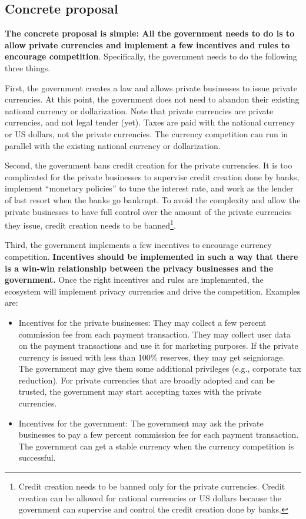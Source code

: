 \documentclass[dvipdfmx,a4paper]{article}
\begin{document}
\subsection{Concrete proposal}

\textbf{The concrete proposal is simple: All the government needs to do is to allow private currencies and implement a few incentives and rules to encourage competition}. Specifically, the government needs to do the following three things.

First, the government creates a law and allows private businesses to issue private currencies. At this point, the government does not need to abandon their existing national currency or dollarization. Note that private currencies are private currencies, and not legal tender (yet). Taxes are paid with the national currency or US dollars, not the private currencies. The currency competition can run in parallel with the existing national currency or dollarization.

Second, the government bans credit creation for the private currencies. It is too complicated for the private businesses to supervise credit creation done by banks, implement ``monetary policies'' to tune the interest rate, and work as the lender of last resort when the banks go bankrupt. To avoid the complexity and allow the private businesses to have full control over the amount of the private currencies they issue, credit creation needs to be banned\footnote{Credit creation needs to be banned only for the private currencies. Credit creation can be allowed for national currencies or US dollars because the government can supervise and control the credit creation done by banks.}.

Third, the government implements a few incentives to encourage currency competition. \textbf{Incentives should be implemented in such a way that there is a win-win relationship between the privacy businesses and the government.} Once the right incentives and rules are implemented, the ecosystem will implement privacy currencies and drive the competition. Examples are:

\begin{itemize}
\item Incentives for the private businesses: They may collect a few percent commission fee from each payment transaction. They may collect user data on the payment transactions and use it for marketing purposes. If the private currency is issued with less than 100\% reserves, they may get seigniorage. The government may give them some additional privileges (e.g., corporate tax reduction). For private currencies that are broadly adopted and can be trusted, the government may start accepting taxes with the private currencies.
\item Incentives for the government: The government may ask the private businesses to pay a few percent commission fee for each payment transaction. The government can get a stable currency when the currency competition is successful.
\end{itemize}
\end{document}
